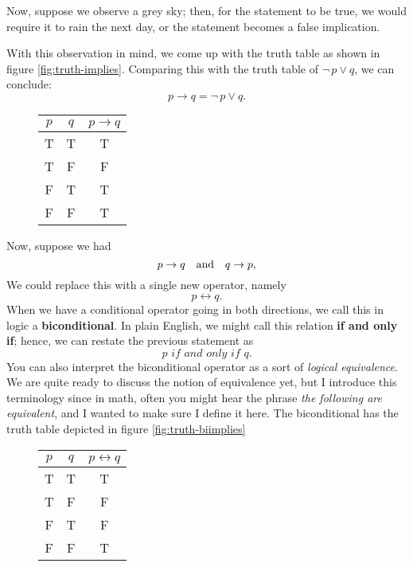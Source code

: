 Now, suppose we observe a grey sky; then, for the statement to be true, we would require it to rain the next day, or the statement becomes a false implication.

With this observation in mind, we come up with the truth table as shown in figure \eqref{fig:truth-implies}.
Comparing this with the truth table of $\neg \,p \vee q$, we can conclude:
$$p \to q = \neg \,p \vee q.$$

\begin{figure}[h]
\centering
	\begin{tabular}{|c|c|c|}
		\hline
		$p$ & $q$ & $p\to q$ \\
		\hline
		T & T & T \\
		\hline
		T & F & F \\
		\hline
		F & T & T \\
		\hline
		F & F & T \\
		\hline
	\end{tabular}
	\caption{}
	\label{fig:truth-implies}
\end{figure}

Now, suppose we had
$$p \to q \quad\text{and}\quad q \to p,$$
We could replace this with a single new operator, namely
$$p \leftrightarrow q.$$
When we have a conditional operator going in both directions, we call this in logic a \textbf{biconditional}.
In plain English, we might call this relation \textbf{if and only if}; hence, we can restate the previous statement as
$$p \textit{ if and only if } q.$$
You can also interpret the biconditional operator as a sort of \textit{logical equivalence}.
We are quite ready to discuss the notion of equivalence yet, but I introduce this terminology since in math, often you might hear the phrase \textit{the following are equivalent}, and I wanted to make sure I define it here.
The biconditional has the truth table depicted in figure \eqref{fig:truth-biimplies}

\begin{figure}[h]
\centering
	\begin{tabular}{|c|c|c|}
		\hline
		$p$ & $q$ & $p\leftrightarrow q$ \\
		\hline
		T & T & T \\
		\hline
		T & F & F \\
		\hline
		F & T & F \\
		\hline
		F & F & T \\
		\hline
	\end{tabular}
	\caption{}
	\label{fig:truth-biimplies}
\end{figure}

